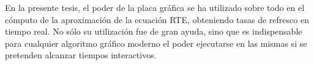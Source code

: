 En la presente tesis, el poder de la placa gráfica se ha utilizado sobre todo en el cómputo de la aproximación de la ecuación RTE, obteniendo tasas de refresco en tiempo real.
No sólo su utilización fue de gran ayuda, sino que es indispensable para cualquier algoritmo gráfico moderno el poder ejecutarse en las mismas si se pretenden alcanzar tiempos interactivos.
